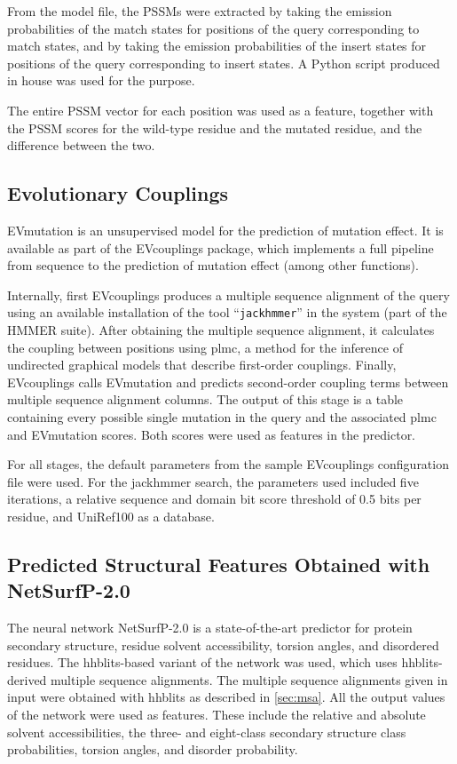 From the model file, the PSSMs were extracted by taking the emission probabilities of the match states for positions of the query corresponding to match states, and by taking the emission probabilities of the insert states for positions of the query corresponding to insert states.
A Python script produced in house was used for the purpose.

The entire PSSM vector for each position was used as a feature, together with the PSSM scores for the wild-type residue and the mutated residue, and the difference between the two.

\subsection{Evolutionary Couplings}\label{sec:ev_mutation}
EVmutation is an unsupervised model for the prediction of mutation effect.
It is available as part of the EVcouplings package, which implements a full pipeline from sequence to the prediction of mutation effect (among other functions).

Internally, first EVcouplings produces a multiple sequence alignment of the query using an available installation of the tool ``\texttt{jackhmmer}'' in the system (part of the HMMER suite).
After obtaining the multiple sequence alignment, it calculates the coupling between positions using plmc, a method for the inference of undirected graphical models that describe first-order couplings.
Finally, EVcouplings calls EVmutation and predicts second-order coupling terms between multiple sequence alignment columns.
The output of this stage is a table containing every possible single mutation in the query and the associated plmc and EVmutation scores.
Both scores were used as features in the predictor.

For all stages, the default parameters from the sample EVcouplings configuration file were used.
For the jackhmmer search, the parameters used included five iterations, a relative sequence and domain bit score threshold of 0.5 bits per residue, and UniRef100 as a database.

\subsection{Predicted Structural Features Obtained with NetSurfP-2.0}
The neural network NetSurfP-2.0 is a state-of-the-art predictor for protein secondary structure, residue solvent accessibility, torsion angles, and disordered residues.
The hhblits-based variant of the network was used, which uses hhblits-derived multiple sequence alignments.
The multiple sequence alignments given in input were obtained with hhblits as described in \cref{sec:msa}.
All the output values of the network were used as features.
These include the relative and absolute solvent accessibilities, the three- and eight-class secondary structure class probabilities, torsion angles, and disorder probability.

